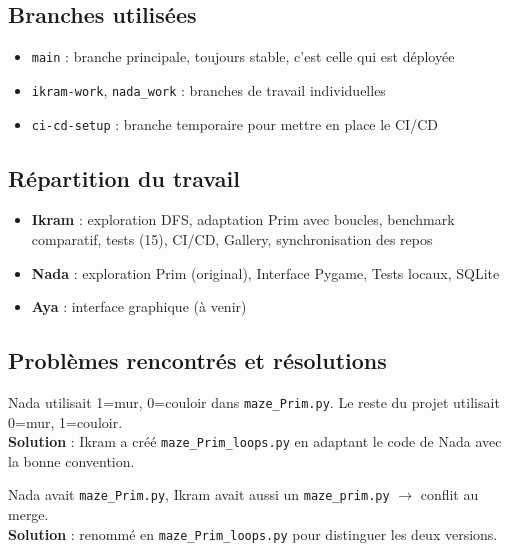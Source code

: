\documentclass[12pt,a4paper]{article}
\begin{document}
\subsection{Branches utilisées}

\begin{itemize}
    \item \texttt{main} : branche principale, toujours stable, c'est celle qui est déployée
    \item \texttt{ikram-work}, \texttt{nada\_work} : branches de travail individuelles
    \item \texttt{ci-cd-setup} : branche temporaire pour mettre en place le CI/CD
\end{itemize}

\subsection{Répartition du travail}

\begin{itemize}
    \item \textbf{Ikram} : exploration DFS, adaptation Prim avec boucles, benchmark comparatif, tests (15), CI/CD, Gallery, synchronisation des repos
    \item \textbf{Nada} : exploration Prim (original), Interface Pygame, Tests locaux, SQLite
    \item \textbf{Aya} : interface graphique (à venir)
\end{itemize}

\subsection{Problèmes rencontrés et résolutions}

\begin{problemebox}[title=\textbf{Problème 1 : Convention inversée (0 vs 1)}]
Nada utilisait 1=mur, 0=couloir dans \texttt{maze\_Prim.py}. Le reste du projet utilisait 0=mur, 1=couloir.\\
\textbf{Solution} : Ikram a créé \texttt{maze\_Prim\_loops.py} en adaptant le code de Nada avec la bonne convention.
\end{problemebox}

\begin{problemebox}[title=\textbf{Problème 2 : Conflit de noms de fichiers}]
Nada avait \texttt{maze\_Prim.py}, Ikram avait aussi un \texttt{maze\_prim.py} $\rightarrow$ conflit au merge.\\
\textbf{Solution} : renommé en \texttt{maze\_Prim\_loops.py} pour distinguer les deux versions.
\end{problemebox}
\end{document}
